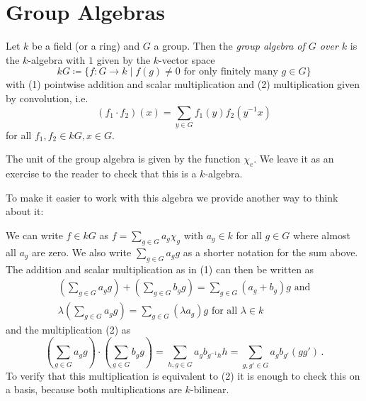 \section{Group Algebras}


\begin{definition}
  Let $k$ be a field (or a ring) and $G$ a group.
  Then the \emph{group algebra of $G$ over $k$} is the $k$-algebra with $1$ given by the $k$-vector space
  \[
              kG
    \coloneqq \{
                f \colon G \to k
              \mid
                f(g) \neq 0 \text{ for only finitely many } g \in G
              \}
  \]
  with (1) pointwise addition and scalar multiplication and (2) multiplication given by convolution, i.e.\
  \[
      (f_1 \cdot f_2)(x)
    = \sum_{y \in G} f_1(y) f_2\left( y^{-1}x \right)
  \]
  for all $f_1, f_2 \in kG, x \in G$.
\end{definition}

The unit of the group algebra is given by the function $\chi_e$.
We leave it as an exercise to the reader to check that this is a $k$-algebra.

To make it easier to work with this algebra we provide another way to think about it:

We can write $f \in kG$ as $f = \sum_{g \in G} a_g \chi_g$ with $a_g \in k$ for all $g \in G$ where almost all $a_g$ are zero.
We also write $\sum_{g \in G} a_g g$ as a shorter notation for the sum above.
The addition and scalar multiplication as in (1) can then be written as
\begin{gather*}
      \left( \sum_{g \in G} a_g g \right)
    + \left( \sum_{g \in G} b_g g \right)
  = \sum_{g \in G} (a_g + b_g) g
  \text{ and}
  \\
    \lambda \left( \sum_{g \in G} a_g g \right)
  = \sum_{g \in G} (\lambda a_g) g
    \text{ for all }
    \lambda \in k
\end{gather*}
and the multiplication (2) as
\[
          \left( \sum_{g \in G} a_g g \right)
    \cdot \left( \sum_{g \in G} b_g g \right)
  = \sum_{h, g \in G} a_g b_{g^{-1}h} h
  = \sum_{g, g' \in G} a_g b_{g'} (g g') \,.
\]
To verify that this multiplication is equivalent to (2) it is enough to check this on a basis, because both multiplications are $k$-bilinear.

